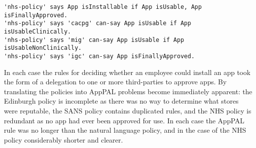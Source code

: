 \documentclass{easychair}
\begin{document}
\begin{lstlisting}[title={\footnotesize\textbf{NHS}:~\itshape ``%
Apps for work usage must not be downloaded onto corporately issued mobile devices (even if approved on the NHS apps store) unless they have been approved through the following Trust channels: Clinical apps; at the time of writing there are no apps clinically approved by the Trust for use with patients / clients. However, if a member of staff believes that there are clinical apps or other technologies that could benefit their patients / clients, this should be discussed with the clinical lead in the first instance and ratification should be sought via the Care and Clinical Policies Group. A clinical app should not be used if it has not been approved via this group. Business apps; at the time of writing there are no business (i.e., non-clinical) apps approved by the Trust for use other than those preloaded onto the device at the point of issue. However, if a member of staff believes that there are apps or other technologies that could benefit their non-clinical work, ratification of the app must be sought via the Management of Information Group (MIG). An app should not be used if it has not been approved via this group. Following approval through Care and Clinical Policies and / or MIG, final approval will be required through Integrated Governance Committee.''}]
'nhs-policy' says App isInstallable if App isUsable, App isFinallyApproved.
'nhs-policy' says 'cacpg' can-say App isUsable if App isUsableClinically.
'nhs-policy' says 'mig' can-say App isUsable if App isUsableNonClinically.
'nhs-policy' says 'igc' can-say App isFinallyApproved.
\end{lstlisting}

In each case the rules for deciding whether an employee could install an app took the form of a delegation to one or more third-parties to approve apps.
By translating the policies into AppPAL problems become immediately apparent: the Edinburgh policy is incomplete as there was no way to determine what stores were reputable, the SANS policy contains duplicated rules, and the NHS policy is redundant as no app had ever been approved for use. 
In each case the AppPAL rule was no longer than the natural language policy, and in the case of the NHS policy considerably shorter and clearer.
\end{document}
